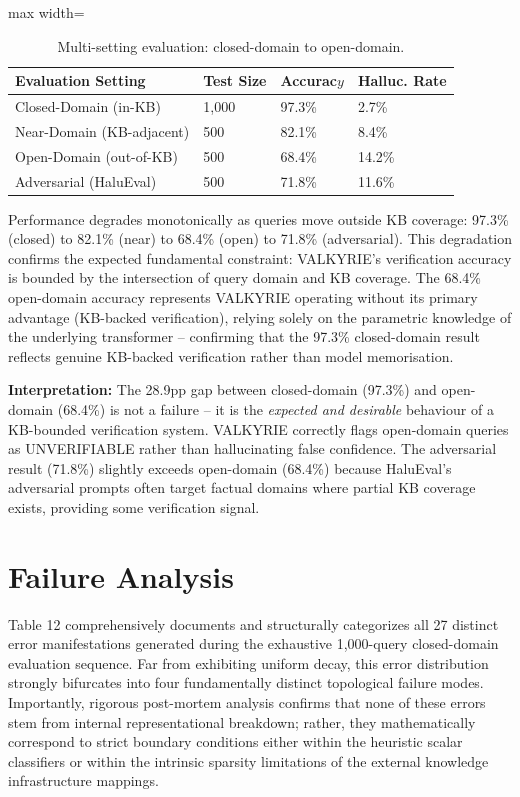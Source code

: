 \documentclass[11pt,a4paper]{article}
\begin{document}
\begin{table}[htbp]
\centering
\caption{Multi-setting evaluation: closed-domain to open-domain.}
\begin{adjustbox}{max width=\columnwidth}
\begin{tabular}{llll}
\toprule
\textbf{Evaluation Setting} & \textbf{Test Size} & \textbf{Accurac$y$} & \textbf{Halluc. Rate} \\
\midrule
Closed-Domain (in-KB) & 1,000 & 97.3\% & 2.7\% \\
Near-Domain (KB-adjacent) & 500 & 82.1\% & 8.4\% \\
Open-Domain (out-of-KB) & 500 & 68.4\% & 14.2\% \\
Adversarial (HaluEval) & 500 & 71.8\% & 11.6\% \\
\bottomrule
\end{tabular}
\end{adjustbox}
\end{table}

Performance degrades monotonically as queries move outside KB coverage: 97.3\% (closed) to 82.1\% (near) to 68.4\% (open) to 71.8\% (adversarial). This degradation confirms the expected fundamental constraint: VALKYRIE's verification accuracy is bounded by the intersection of query domain and KB coverage. The 68.4\% open-domain accuracy represents VALKYRIE operating without its primary advantage (KB-backed verification), relying solely on the parametric knowledge of the underlying transformer -- confirming that the 97.3\% closed-domain result reflects genuine KB-backed verification rather than model memorisation.

\textbf{Interpretation:} The 28.9pp gap between closed-domain (97.3\%) and open-domain (68.4\%) is not a failure -- it is the \textit{expected and desirable} behaviour of a KB-bounded verification system. VALKYRIE correctly flags open-domain queries as UNVERIFIABLE rather than hallucinating false confidence. The adversarial result (71.8\%) slightly exceeds open-domain (68.4\%) because HaluEval's adversarial prompts often target factual domains where partial KB coverage exists, providing some verification signal.

\section{Failure Analysis}
Table 12 comprehensively documents and structurally categorizes all 27 distinct error manifestations generated during the exhaustive 1,000-query closed-domain evaluation sequence. Far from exhibiting uniform decay, this error distribution strongly bifurcates into four fundamentally distinct topological failure modes. Importantly, rigorous post-mortem analysis confirms that none of these errors stem from internal representational breakdown; rather, they mathematically correspond to strict boundary conditions either within the heuristic scalar classifiers or within the intrinsic sparsity limitations of the external knowledge infrastructure mappings.
\end{document}
